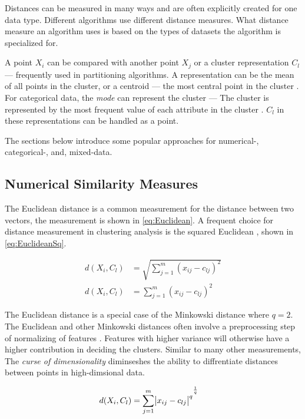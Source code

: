 \documentclass[../report.tex]{subfiles}
\begin{document}
Distances can be measured in many ways and are often explicitly created for one data type. Different algorithms use different distance measures. What distance measure an algorithm uses is based on the types of datasets the algorithm is specialized for.

A point $X_i$ can be compared with another point $X_j$ or a cluster representation $C_l$ --- frequently used in partitioning algorithms. A representation can be the mean of all points in the cluster, or a centroid --- the most central point in the cluster \cite{Guha2000, Kaufman1990}. For categorical data, the \textit{mode} can represent the cluster --- The cluster is represented by the most frequent value of each attribute in the cluster \cite{Ng1999}. $C_l$ in these representations can be handled as a point.

The sections below introduce some popular approaches for numerical-, categorical-, and, mixed-data.

\subsection{Numerical Similarity Measures}

The Euclidean distance is a common measurement for the distance between two vectors, the measurement is shown in \ref{eq:Euclidean}. A frequent choice for distance measurement in clustering analysis is the squared Euclidean \cite{Jain1999, Huang1998, huang2005automated}, shown in \ref{eq:EuclideanSq}.

\begin{align}
  \label{eq:Euclidean}
  d(X_i,C_l) &= \sqrt{\sum^{m}_{j=1}(x_{ij} - c_{lj})^2} \\
  \label{eq:EuclideanSq}
  d(X_i,C_l) &= \sum^{m}_{j=1}(x_{ij} - c_{lj})^2
\end{align}

The Euclidean distance is a special case of the Minkowski distance where $q=2$. The Euclidean and other Minkowski distances often involve a preprocessing step of normalizing of features \cite{Jain1999}. Features with higher variance will otherwise have a higher contribution in deciding the clusters. Similar to many other measurements, The \textit{curse of dimensionality} diminseshes the ability to diffrentiate distances between points in high-dimsional data\cite{Parsons2004}.

\begin{align}
  \label{eq:mikowski}
  d(X_i,C_l) &= {\sum^{m}_{j=1}\abs{x_{ij} - c_{lj}}^q}^{\frac{1}{q}}
\end{align}
\end{document}
